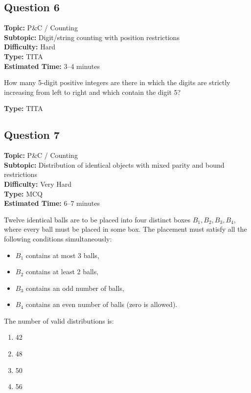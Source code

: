 \documentclass[11pt]{article}
\begin{document}
\subsection*{Question 6}
\textbf{Topic:} P\&C / Counting \\
\textbf{Subtopic:} Digit/string counting with position restrictions \\
\textbf{Difficulty:} Hard \\
\textbf{Type:} TITA \\
\textbf{Estimated Time:} 3--4 minutes

\begin{tcolorbox}
How many 5-digit positive integers are there in which the digits are strictly increasing from left to right and which contain the digit 5?
\end{tcolorbox}

\textbf{Type:} TITA

\subsection*{Question 7}
\textbf{Topic:} P\&C / Counting \\
\textbf{Subtopic:} Distribution of identical objects with mixed parity and bound restrictions \\
\textbf{Difficulty:} Very Hard \\
\textbf{Type:} MCQ \\
\textbf{Estimated Time:} 6--7 minutes

\begin{tcolorbox}
Twelve identical balls are to be placed into four distinct boxes \( B_1, B_2, B_3, B_4 \), where every ball must be placed in some box. The placement must satisfy all the following conditions simultaneously:
\begin{itemize}
\item \( B_1 \) contains at most 3 balls,
\item \( B_2 \) contains at least 2 balls,
\item \( B_3 \) contains an odd number of balls,
\item \( B_4 \) contains an even number of balls (zero is allowed).
\end{itemize}
The number of valid distributions is:
\end{tcolorbox}

\begin{enumerate}[label=(\Alph*)]
\item 42
\item 48
\item 50
\item 56
\end{enumerate}
\end{document}
